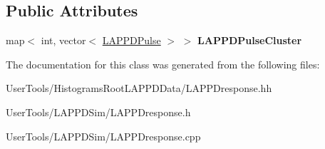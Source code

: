 \subsection*{Public Attributes}
\begin{DoxyCompactItemize}
\item 
\hypertarget{classLAPPDresponse_ae10b5dcda1903b993df6891d60b1e0d4}{map$<$ int, vector$<$ \hyperlink{classLAPPDPulse}{L\-A\-P\-P\-D\-Pulse} $>$ $>$ {\bfseries L\-A\-P\-P\-D\-Pulse\-Cluster}}\label{classLAPPDresponse_ae10b5dcda1903b993df6891d60b1e0d4}

\end{DoxyCompactItemize}


The documentation for this class was generated from the following files\-:\begin{DoxyCompactItemize}
\item 
User\-Tools/\-Histograms\-Root\-L\-A\-P\-P\-D\-Data/L\-A\-P\-P\-Dresponse.\-hh\item 
User\-Tools/\-L\-A\-P\-P\-D\-Sim/L\-A\-P\-P\-Dresponse.\-h\item 
User\-Tools/\-L\-A\-P\-P\-D\-Sim/L\-A\-P\-P\-Dresponse.\-cpp\end{DoxyCompactItemize}
